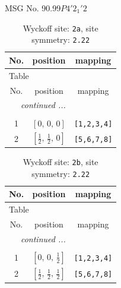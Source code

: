\documentclass[fleqn,8pt]{jsarticle}
\begin{document}
\setcounter{MaxMatrixCols}{32}

\renewcommand{\tablename}{Table~}
\renewcommand{\figurename}{Figure~}
\begin{center}
\LARGE
MSG No. 90.99\quad$P4'2_{1}'2$
\end{center}
\renewcommand{\arraystretch}{1.2}
\begin{longtable}{ccc}
\caption{Wyckoff site: {\tt 2a}, site symmetry: {\tt 2.22}}
 \\
 \hline \hline
No. & position & mapping \\ \hline \endfirsthead

\multicolumn{2}{l}{\tablename\ \thetable{}} \\
 \hline \hline
No. & position & mapping \\ \hline \endhead

 \hline \hline
\multicolumn{2}{r}{\footnotesize\it continued ...} \\ \endfoot

 \hline \hline
\multicolumn{2}{r}{} \\ \endlastfoot

1 & $\left[ 0,\, 0,\, 0 \right]$ & {\tt [1,2,3,4]} \\ \hline
2 & $\left[ \frac{1}{2},\, \frac{1}{2},\, 0 \right]$ & {\tt [5,6,7,8]} \\
\end{longtable}
\renewcommand{\arraystretch}{1.2}
\begin{longtable}{ccc}
\caption{Wyckoff site: {\tt 2b}, site symmetry: {\tt 2.22}}
 \\
 \hline \hline
No. & position & mapping \\ \hline \endfirsthead

\multicolumn{2}{l}{\tablename\ \thetable{}} \\
 \hline \hline
No. & position & mapping \\ \hline \endhead

 \hline \hline
\multicolumn{2}{r}{\footnotesize\it continued ...} \\ \endfoot

 \hline \hline
\multicolumn{2}{r}{} \\ \endlastfoot

1 & $\left[ 0,\, 0,\, \frac{1}{2} \right]$ & {\tt [1,2,3,4]} \\ \hline
2 & $\left[ \frac{1}{2},\, \frac{1}{2},\, \frac{1}{2} \right]$ & {\tt [5,6,7,8]} \\
\end{longtable}
\end{document}
